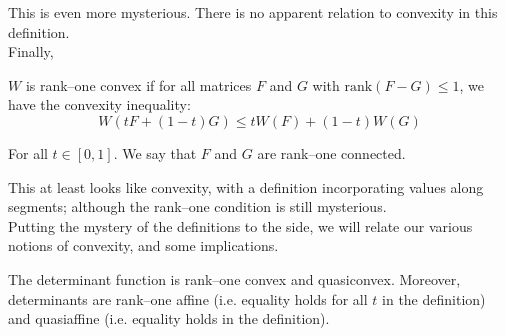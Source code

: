 \documentclass[../main.tex]{subfiles}
\begin{document}
This is even more mysterious.
There is no apparent relation to convexity in this definition. \\

Finally,

\begin{defn}
	$W$ is rank--one convex if for all matrices $F$ and $G$ with $\mathrm{rank}(F-G) \leq 1$, we have the convexity inequality:
	\begin{equation*}
		W(t F + (1-t) G) \leq t W(F) + (1-t) W(G)
	\end{equation*}

	For all $t \in [0,1]$. We say that $F$ and $G$ are rank--one connected.
\end{defn}

This at least looks like convexity, with a definition incorporating values along segments; although the rank--one condition is still mysterious. \\

Putting the mystery of the definitions to the side, we will relate our various notions of convexity, and some implications.

\begin{lem}
	The determinant function is rank--one convex and quasiconvex.
	Moreover, determinants are rank--one affine (i.e. equality holds for all $t$ in the definition) and quasiaffine (i.e. equality holds in the definition).
\end{lem}
\end{document}
